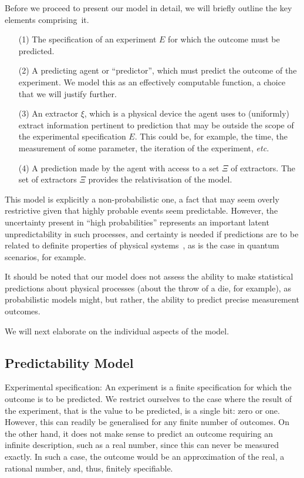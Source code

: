 \documentclass[information,article,accept,moreauthors,pdftex,12pt,a4paper]{mdpi}
\theoremstyle{mdpi}
\newcounter{ex}
\newcounter{re}
\theoremstyle{mdpidefinition}
\begin{document}
Before we proceed to present our model in detail, we will briefly outline the key elements \mbox{comprising it.}
\begin{enumerate}
	\item[(1)] The specification of an experiment $E$ for which the outcome must be predicted.
	\item[(2)] A predicting agent or ``predictor'', which must predict the outcome of the experiment.
	We model this as an effectively computable function, a choice that we will justify further.
	\item[(3)] An extractor $\xi$, which is a physical device the agent uses to (uniformly) extract information pertinent to prediction that may be outside the scope of the experimental specification $E$. This could be, for example, the time, the measurement of some parameter, the iteration of the experiment, \emph{etc.}
	\item[(4)] A prediction made by the agent with access to a set $\Xi$ of extractors. The set of extractors $\Xi$ provides the relativisation of the model.
\end{enumerate}

This model is explicitly a non-probabilistic one, a fact that may seem overly restrictive given that highly probable events seem predictable.
However, the uncertainty present in ``high probabilities'' represents an important latent unpredictability in such processes, and certainty is needed if predictions are to be related to definite properties of physical systems~\cite{epr}, as is the case
in quantum scenarios, for example.

It should be noted that our model does not assess the ability to make statistical predictions about physical processes (about the throw of a die, for example), as probabilistic models might, but rather, the ability to predict precise measurement outcomes.

We will next elaborate on the individual aspects of the model.

\subsection{Predictability Model}

{Experimental specification:}
An experiment is a finite specification for which the outcome is to be predicted.
We restrict ourselves to the case where the result of the experiment, that is the value to be predicted, is a single bit: zero or one.
However, this can readily be generalised for any finite number of outcomes.
On the other hand, it does not make sense to predict an outcome requiring an infinite description, such as a real number, since this can never be measured exactly.
In such a case, the outcome would be an approximation of the real, a rational number, and, thus, finitely specifiable.
\end{document}
